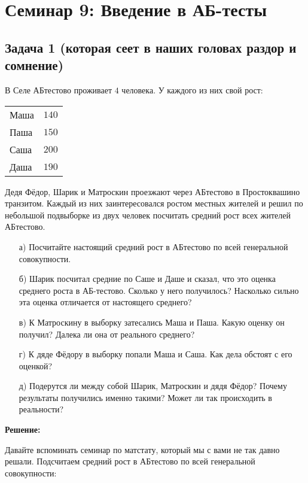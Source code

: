 \documentclass[12pt, a4paper, oneside]{article}
\begin{document}
\section*{Семинар 9: Введение в АБ-тесты }

\subsection*{Задача 1 (которая сеет в наших головах раздор и сомнение)}

В Селе  АБтестово проживает $4$ человека. У каждого из них свой рост:

\begin{center}
	\begin{tabular}{lc}
		\toprule
		Маша & $140$  \\
		Паша &  $150$\\
		Саша &  $200$\\
		Даша &  $190$\\ 
		\bottomrule
	\end{tabular}	
\end{center}

Дедя Фёдор, Шарик и Матроскин проезжают через АБтестово в Простоквашино транзитом. Каждый из них заинтересовался ростом местных жителей и решил по небольшой подвыборке из двух человек посчитать средний рост всех жителей АБтестово. 

\begin{enumerate} 
	\item[а)] Посчитайте настоящий средний рост в АБтестово по всей генеральной совокупности.
	\item[б)] Шарик посчитал средние по Саше и Даше и сказал, что это оценка среднего роста в АБ-тестово. Сколько у него получилось? Насколько сильно эта оценка отличается от настоящего среднего? 
	\item[в)] К Матроскину в выборку затесались Маша и Паша. Какую оценку он получил? Далека ли она от реального среднего? 
	\item[г)] К дяде Фёдору в выборку попали Маша и Саша. Как дела обстоят с его оценкой? 
	\item[д)] Подерутся ли между собой Шарик, Матроскин и дядя Фёдор? Почему результаты получились именно такими? Может ли так происходить в реальности? 
\end{enumerate} 

\textbf{Решение:} 

Давайте вспоминать семинар по матстату, который мы с вами не так давно решали. Подсчитаем средний рост в АБтестово  по всей генеральной совокупности: 
\end{document}
